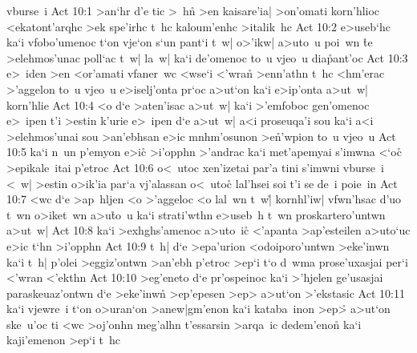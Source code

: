 vburse~i\bibvsend
\vs Act 10:1
>an`hr
d'e
tic
>~h\r{n}
>en
kaisare'ia|
>on'omati
korn'hlioc
<ekatont'arqhc
>ek
spe'irhc
t~hc
kaloum'enhc
>italik~hc\bibvsend
\vs Act 10:2
e>useb`hc
ka`i
vfobo'umenoc
t`on
vje`on
s`un
pant`i
t~w|
o>'ikw|
a>uto~u
poi~wn
\r{t}e
>elehmos'unac
poll`ac
t~w|
la~w|
ka`i
de'omenoc
to~u
vjeo~u
dia\-\r{p}an\-t'oc\bibvsend
{}
\vs Act 10:3
e>~iden
>en
<or'amati
vfaner~wc
<wse`i
<'wran\r{}
>enn'athn
t~hc
<hm'erac
>'aggelon
to~u
vjeo~u
e>iselj'onta
pr`oc
a>ut`on
ka`i
e>ip'onta
a>ut~w|
korn'hlie\bibvsend
\vs Act 10:4
<o
d`e
>aten'isac
a>ut~w|
ka`i
>'emfoboc
gen'omenoc
e>~ipen
t'i
>estin
k'urie
e>~ipen
d`e
a>ut~w|
a<i
proseuqa'i
sou
ka`i
a<i
>elehmos'unai
sou
>an'ebhsan
e>ic
mnhm'osunon
>e\r{n}'wpion
to~u
vjeo~u\bibvsend
\vs Act 10:5
ka`i
n~un
p'emyon
e>ic\r{}
>i'opphn
>'andrac
ka`i
met'apemyai
s'imwna
<`oc\r{}
>epikale~itai
p'etroc\bibvsend
\vs Act 10:6
o<~utoc
xen'izetai
par'a
tini
s'imwni
vburse~i
<~w|
>estin
o>ik'ia
par`a
vj'alassan
o<~utoc\r{}
lal'hsei
soi
t'i
se
de~i
poie~in\bibvsend
\vs Act 10:7
<wc
d`e
>ap~hljen
<o
>'aggeloc
<o
lal~wn
t~w|\r{}
kornhl'iw|
vfwn'hsac
d'uo
t~wn
o>iket~wn
a>u\r{t}o~u
ka`i
strati'wthn
e>useb~h
t~wn
proskartero'untwn
a>ut~w|\bibvsend
\vs Act 10:8
ka`i
>exhghs'amenoc
a>uto~ic\r{}
<'apanta
>ap'esteilen
a>uto`uc
e>ic
t`hn
>i'opphn\bibvsend
\vs Act 10:9
t~h|
d`e
>epa'urion
<odoiporo'untwn
>eke'inwn
ka`i
t~h|
p'olei
>eggiz'ontwn
>an'ebh
p'etroc
>ep`i
t`o
d~wma
prose'uxasjai
per`i
<'wran
<'ekthn\bibvsend
\vs Act 10:10
>eg'eneto
d`e
pr'ospeinoc
ka`i
>'hjelen
ge'usasjai
paraskeuaz'ontwn
d`e
>eke'inwn\r{}
>ep'epesen
>ep>
a>ut`on
>'ekstasic\bibvsend
\vs Act 10:11
ka`i
vjewre~i
t`on
o>uran`on
>anew|gm'enon
ka`i
kataba~inon
>ep>\r{}
a>ut`on
ske~u'oc
ti
<wc
>oj'onhn
meg'alhn
t'essarsin
>arqa~ic
dedem'enon\r{}
ka`i
kaji'emenon
>ep`i
t~hc
